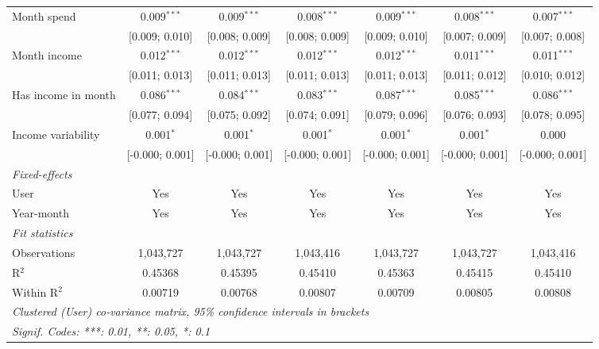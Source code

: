 \begin{table}[htbp]
\begin{threeparttable}[b]
\begin{tabular}{lcccccc}
         Month spend                & 0.009$^{***}$   & 0.009$^{***}$   & 0.008$^{***}$   & 0.009$^{***}$    & 0.008$^{***}$    & 0.007$^{***}$\\   
                                    & [0.009; 0.010]  & [0.008; 0.009]  & [0.008; 0.009]  & [0.009; 0.010]   & [0.007; 0.009]   & [0.007; 0.008]\\   
         Month income               & 0.012$^{***}$   & 0.012$^{***}$   & 0.012$^{***}$   & 0.012$^{***}$    & 0.011$^{***}$    & 0.011$^{***}$\\   
                                    & [0.011; 0.013]  & [0.011; 0.013]  & [0.011; 0.013]  & [0.011; 0.013]   & [0.011; 0.012]   & [0.010; 0.012]\\   
         Has income in month        & 0.086$^{***}$   & 0.084$^{***}$   & 0.083$^{***}$   & 0.087$^{***}$    & 0.085$^{***}$    & 0.086$^{***}$\\   
                                    & [0.077; 0.094]  & [0.075; 0.092]  & [0.074; 0.091]  & [0.079; 0.096]   & [0.076; 0.093]   & [0.078; 0.095]\\   
         Income variability         & 0.001$^{*}$     & 0.001$^{*}$     & 0.001$^{*}$     & 0.001$^{*}$      & 0.001$^{*}$      & 0.000\\   
                                    & [-0.000; 0.001] & [-0.000; 0.001] & [-0.000; 0.001] & [-0.000; 0.001]  & [-0.000; 0.001]  & [-0.000; 0.001]\\   
         \midrule
         \emph{Fixed-effects}\\
         User                       & Yes             & Yes             & Yes             & Yes              & Yes              & Yes\\  
         Year-month                 & Yes             & Yes             & Yes             & Yes              & Yes              & Yes\\  
         \midrule
         \emph{Fit statistics}\\
         Observations               & 1,043,727       & 1,043,727       & 1,043,416       & 1,043,727        & 1,043,727        & 1,043,416\\  
         R$^2$                      & 0.45368         & 0.45395         & 0.45410         & 0.45363          & 0.45415          & 0.45410\\  
         Within R$^2$               & 0.00719         & 0.00768         & 0.00807         & 0.00709          & 0.00805          & 0.00808\\  
         \midrule \midrule
         \multicolumn{7}{l}{\emph{Clustered (User) co-variance matrix, 95\% confidence intervals in brackets}}\\
         \multicolumn{7}{l}{\emph{Signif. Codes: ***: 0.01, **: 0.05, *: 0.1}}\\
      \end{tabular}
   \end{threeparttable}
\end{table}


